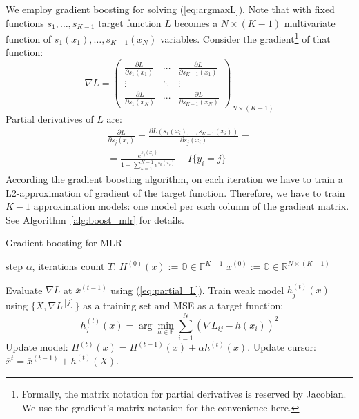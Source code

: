 \documentclass{article}
\begin{document}
We employ gradient boosting for solving (\ref{eq:argmaxL}).
Note that with fixed functions $s_1,\ldots,s_{K-1}$ target function $L$ becomes a $N\times(K-1)$ multivariate function of $s_1(x_1),\ldots,s_{K-1}(x_N)$ variables. Consider the gradient\footnote{Formally, the matrix notation for partial derivatives is reserved by Jacobian. We use the gradient's matrix notation for the convenience here.} of that function:
\[
\nabla L = 
\left(
\begin{array}{ccc}
	  \frac{ \partial L }{ \partial s_{1}(x_{1}) } 
	& \cdots 
	& \frac{ \partial L }{ \partial s_{K-1}(x_{1}) } \\

	  \vdots & \ddots & \vdots\\

	  \frac{ \partial L }{ \partial s_{1}(x_{N}) } 
	& \cdots 
	& \frac{ \partial L }{ \partial s_{K-1}(x_{N}) }
\end{array}
\right)_{N \times (K-1)}
\]
Partial derivatives of $L$ are:
\begin{multline}
\frac{ \partial L }{ \partial s_{j}(x_{i}) }=
\frac{ \partial L(s_{1}(x_{i}),\dots,s_{K-1}(x_{i})) }{ \partial s_{j}(x_{i}) }= \\ =
\frac{ e^{s_{j}(x_{i})} }{ 1+\sum_{k=1}^{K-1} e^{s_{k}(x_{i})} } - I\{y_{i} = j\} \label{eq:partial_L}
\end{multline}
According the gradient boosting algorithm, on each iteration we have to train a L2-approximation of gradient of the target function. Therefore, we have to train $K-1$ approximation models: one  model per each column of the gradient matrix. See Algorithm~\ref{alg:boost_mlr} for details.


\begin{algorithm}[tb]
   \caption{Gradient boosting for MLR}
   \label{alg:boost_mlr}
\begin{algorithmic}
    step $\alpha$, iterations count $T$.
   \STATE $H^{(0)}(x):= \mathbb{O} \in \mathbb{F}^{K-1}$ 
   \STATE $\overline{x}^{(0)} := \mathbb{O} \in \mathbb{R}^{N \times (K-1)}$ 

   		\STATE Evaluate $\nabla L$ at $\overline{x}^{(t-1)}$ using (\ref{eq:partial_L}).
   			\STATE Train weak model $h_{j}^{(t)}(x)$ using $\{X,\nabla L^{[j]}\}$ as a training set and MSE as a target function:
   			\[
				h_{j}^{(t)}(x)=\arg\min_{h \in \mathbb{F}} \sum_{i=1}^{N}\left(\nabla L_{ij}-h(x_{i})\right)^{2}
			\]
		\ENDFOR
		\STATE Update model: $H^{(t)}(x)=H^{(t-1)}(x)+\alpha h^{(t)}(x)$.
		\STATE Update cursor: $\overline{x}^{t} = \overline{x}^{(t-1)} + h^{(t)}(X)$.
   \ENDFOR
   
\end{algorithmic}
\end{algorithm}
\end{document}
